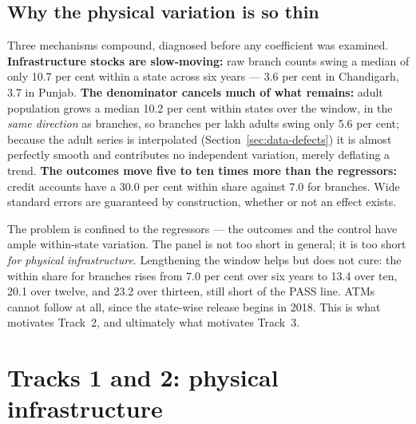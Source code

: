 \subsection{Why the physical variation is so thin}

Three mechanisms compound, diagnosed before any coefficient was examined. \textbf{Infrastructure
stocks are slow-moving:} raw branch counts swing a median of only 10.7 per cent within a state
across six years --- 3.6 per cent in Chandigarh, 3.7 in Punjab. \textbf{The denominator cancels
much of what remains:} adult population grows a median 10.2 per cent within states over the window,
in the \emph{same direction} as branches, so branches per lakh adults swing only 5.6 per cent;
because the adult series is interpolated (Section~\ref{sec:data-defects}) it is almost perfectly
smooth and contributes no independent variation, merely deflating a trend. \textbf{The outcomes
move five to ten times more than the regressors:} credit accounts have a 30.0 per cent within share
against 7.0 for branches. Wide standard errors are guaranteed by construction, whether or not an
effect exists.

The problem is confined to the regressors --- the outcomes and the control have ample within-state
variation. The panel is not too short in general; it is too short \emph{for physical
infrastructure}. Lengthening the window helps but does not cure: the within share for branches
rises from 7.0 per cent over six years to 13.4 over ten, 20.1 over twelve, and 23.2 over thirteen,
still short of the PASS line. ATMs cannot follow at all, since the state-wise release begins in
2018. This is what motivates Track~2, and ultimately what motivates Track~3.

\section{Tracks 1 and 2: physical infrastructure}
\label{sec:h1-physical}

